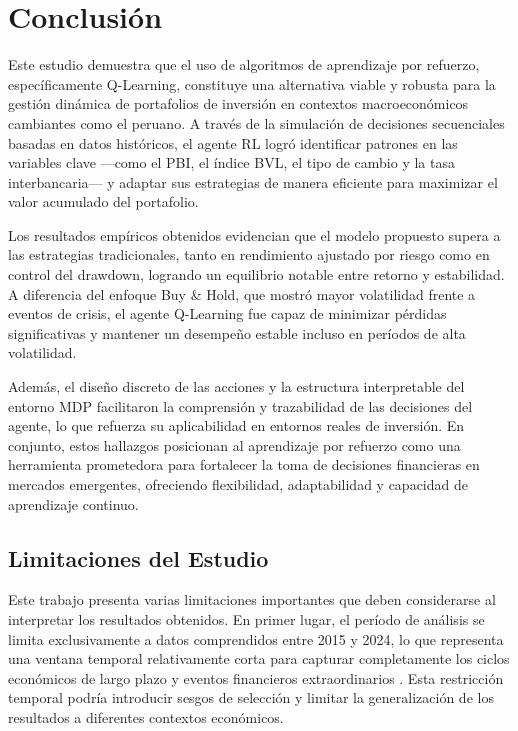 \documentclass[conference]{IEEEtran}
\begin{document}
	
	\section{Conclusión}
	
	Este estudio demuestra que el uso de algoritmos de aprendizaje por refuerzo, específicamente Q-Learning, constituye una alternativa viable y robusta para la gestión dinámica de portafolios de inversión en contextos macroeconómicos cambiantes como el peruano. A través de la simulación de decisiones secuenciales basadas en datos históricos, el agente RL logró identificar patrones en las variables clave —como el PBI, el índice BVL, el tipo de cambio y la tasa interbancaria— y adaptar sus estrategias de manera eficiente para maximizar el valor acumulado del portafolio.
	
	Los resultados empíricos obtenidos evidencian que el modelo propuesto supera a las estrategias tradicionales, tanto en rendimiento ajustado por riesgo como en control del drawdown, logrando un equilibrio notable entre retorno y estabilidad. A diferencia del enfoque Buy \& Hold, que mostró mayor volatilidad frente a eventos de crisis, el agente Q-Learning fue capaz de minimizar pérdidas significativas y mantener un desempeño estable incluso en períodos de alta volatilidad.
	
	Además, el diseño discreto de las acciones y la estructura interpretable del entorno MDP facilitaron la comprensión y trazabilidad de las decisiones del agente, lo que refuerza su aplicabilidad en entornos reales de inversión. En conjunto, estos hallazgos posicionan al aprendizaje por refuerzo como una herramienta prometedora para fortalecer la toma de decisiones financieras en mercados emergentes, ofreciendo flexibilidad, adaptabilidad y capacidad de aprendizaje continuo.
	
	\subsection{Limitaciones del Estudio}
	
	Este trabajo presenta varias limitaciones importantes que deben considerarse al interpretar los resultados obtenidos. En primer lugar, el período de análisis se limita exclusivamente a datos comprendidos entre 2015 y 2024, lo que representa una ventana temporal relativamente corta para capturar completamente los ciclos económicos de largo plazo y eventos financieros extraordinarios \cite{campbell2017financial}. Esta restricción temporal podría introducir sesgos de selección y limitar la generalización de los resultados a diferentes contextos económicos.
	
\end{document}
